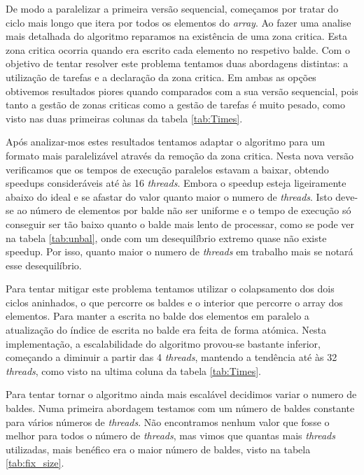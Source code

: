 \documentclass[a4paper]{report}
\begin{document}
De modo a paralelizar a primeira versão sequencial, começamos por tratar do
ciclo mais longo que itera por todos os elementos do \textit{array}. Ao fazer
uma analise mais detalhada do algoritmo reparamos na existência de uma zona
critica. Esta zona critica ocorria quando era escrito cada elemento no respetivo
balde. Com o objetivo de tentar resolver este problema tentamos duas abordagens
distintas: a utilização de tarefas e a declaração da zona critica. Em ambas as
opções obtivemos resultados piores quando comparados com a sua versão
sequencial, pois tanto a gestão de zonas criticas como a gestão de tarefas é
muito pesado, como visto nas duas primeiras colunas da tabela \ref{tab:Times}.

Após analizar-mos estes resultados tentamos adaptar o algoritmo para um formato
mais paralelizável através da remoção da zona critica. Nesta nova versão
verificamos que os tempos de execução paralelos estavam a baixar, obtendo
speedups consideráveis até às 16 \textit{threads}. Embora o speedup esteja
ligeiramente abaixo do ideal e se afastar do valor quanto maior o numero de
\textit{threads}. Isto deve-se ao número de elementos por balde não ser uniforme
e o tempo de execução só conseguir ser tão baixo quanto o balde mais lento de
processar, como se pode ver na tabela \ref{tab:unbal}, onde com um desequilíbrio
extremo quase não existe speedup. 
Por isso, quanto maior o numero de \textit{threads} em trabalho mais
se notará esse desequilíbrio.

Para tentar mitigar este problema tentamos utilizar o colapsamento dos dois
ciclos aninhados, o que percorre os baldes e o interior que percorre o array dos
elementos. Para manter a escrita no balde dos elementos em paralelo a
atualização do índice de escrita no balde era feita de forma atómica. Nesta
implementação, a escalabilidade do algoritmo provou-se bastante inferior,
começando a diminuir a partir das 4 \textit{threads}, mantendo a tendência até
às 32 \textit{threads}, como visto na ultima coluna da tabela \ref{tab:Times}.

Para tentar tornar o algoritmo ainda mais escalável decidimos variar o numero
de baldes. Numa primeira abordagem testamos com um número de baldes constante
para vários números de \textit{threads}. Não encontramos nenhum valor que fosse
o melhor para todos o número de \textit{threads}, mas vimos que quantas mais
\textit{threads} utilizadas, mais benéfico era o maior número de baldes, visto
na tabela \ref{tab:fix_size}.

\pagebreak
\end{document}
